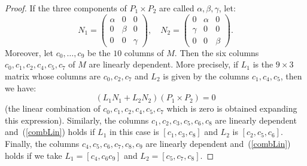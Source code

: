 \documentclass{amsart}
\theoremstyle{plain}
\theoremstyle{definition}
\begin{document}
\begin{proof}
If the three components of $P_1 \times P_2$ are called $\alpha, \beta, \gamma$,
let:
\[
N_1 = \left(
\begin{array}{ccc}
\alpha & 0 & 0 \\
0 & \beta & 0\\
0 & 0 & \gamma
\end{array}
\right), \quad
N_2 = \left(
\begin{array}{ccc}
0 & \alpha & 0 \\
\gamma & 0 & 0\\
0 & 0 & \beta
\end{array}
\right).
\]
Moreover, let $c_0, \dots, c_9$ be the $10$ columns of $M$. Then the six
columns $c_0, c_1, c_2, c_4, c_5, c_7$ of $M$ are linearly dependent. More
precisely, if $L_1$ is the $9\times 3$ matrix whose columns are
$c_0, c_2, c_7$ and $L_2$ is given by the columns $c_1, c_4, c_5$,
then we have:
\begin{equation}
(L_1 N_1 + L_2N_2) (P_1\times P_2) = 0
\label{combLin}
\end{equation}
(the linear combination of $c_0, c_1, c_2, c_4, c_5, c_7$ which is zero
is obtained expanding this expression).
Similarly, the columns $c_1, c_2, c_3, c_5, c_6, c_8$ are linearly dependent
and~(\ref{combLin}) holds if $L_1$ in this case is $[c_1, c_3, c_8]$ and
$L_2$ is $[c_2, c_5, c_6]$. Finally, the columns
$c_4, c_5, c_6, c_7, c_8, c_9$ are linearly dependent and~(\ref{combLin})
holds if we take $L_1 = [c_4, c_6 c_9]$ and $L_2 = [c_5, c_7, c_8]$.


\end{proof}
\end{document}
